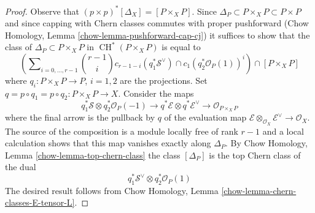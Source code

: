 \documentclass[10pt,a4paper]{amsart}
\theoremstyle{plain}
\theoremstyle{definition}
\theoremstyle{remark}
\numberwithin{equation}{subsection}
\def\CH{\mathop{\mathrm{CH}}\nolimits}
\begin{document}
\begin{proof}
Observe that $(p \times p)^*[\Delta_X] = [P \times_X P]$.
Since $\Delta_P \subset P \times_X P \subset P \times P$
and since capping with Chern classes commutes with proper pushforward
(Chow Homology, Lemma \ref{chow-lemma-pushforward-cap-cj})
it suffices to show that the class of
$\Delta_P \subset P \times_X P$ in $\CH^*(P \times_X P)$
is equal to
$$
\left(\sum\nolimits_{i = 0, \ldots, r - 1}
{r - 1 \choose i} c_{r - 1 - i}(q_1^*\mathcal{S}^\vee) \cap
c_1(q_2^*\mathcal{O}_P(1))^i\right)
\cap
[P \times_X P]
$$
where $q_i : P \times_X P \to P$, $i = 1, 2$ are the projections.
Set $q = p \circ q_1 = p \circ q_2 : P \times_X P \to X$.
Consider the maps
$$
q_1^*\mathcal{S} \otimes q_2^*\mathcal{O}_P(-1) \to
q^*\mathcal{E} \otimes q^*\mathcal{E}^\vee \to
\mathcal{O}_{P \times_X P}
$$
where the final arrow is the pullback by $q$ of the evaluation map
$\mathcal{E} \otimes_{\mathcal{O}_X} \mathcal{E}^\vee \to \mathcal{O}_X$.
The source of the composition is a module locally free of rank $r - 1$
and a local calculation shows that this map vanishes exactly along
$\Delta_P$. By Chow Homology, Lemma \ref{chow-lemma-top-chern-class}
the class $[\Delta_P]$ is the top Chern class of the dual
$$
q_1^*\mathcal{S}^\vee \otimes q_2^*\mathcal{O}_P(1)
$$
The desired result follows from Chow Homology, Lemma
\ref{chow-lemma-chern-classes-E-tensor-L}.
\end{proof}
\end{document}

